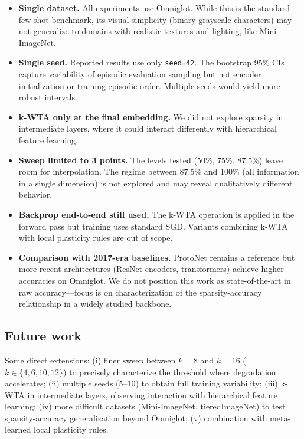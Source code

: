 \documentclass[11pt]{article}
\begin{document}
\begin{itemize}
\item \textbf{Single dataset.} All experiments use Omniglot. While this is the standard few-shot benchmark, its visual simplicity (binary grayscale characters) may not generalize to domains with realistic textures and lighting, like Mini-ImageNet.
\item \textbf{Single seed.} Reported results use only \texttt{seed=42}. The bootstrap 95\% CIs capture variability of episodic evaluation sampling but not encoder initialization or training episodic order. Multiple seeds would yield more robust intervals.
\item \textbf{k-WTA only at the final embedding.} We did not explore sparsity in intermediate layers, where it could interact differently with hierarchical feature learning.
\item \textbf{Sweep limited to 3 points.} The levels tested (50\%, 75\%, 87.5\%) leave room for interpolation. The regime between 87.5\% and 100\% (all information in a single dimension) is not explored and may reveal qualitatively different behavior.
\item \textbf{Backprop end-to-end still used.} The k-WTA operation is applied in the forward pass but training uses standard SGD. Variants combining k-WTA with local plasticity rules are out of scope.
\item \textbf{Comparison with 2017-era baselines.} ProtoNet remains a reference but more recent architectures (ResNet encoders, transformers) achieve higher accuracies on Omniglot. We do not position this work as state-of-the-art in raw accuracy---focus is on characterization of the sparsity-accuracy relationship in a widely studied backbone.
\end{itemize}

\subsection{Future work}

Some direct extensions: (i) finer sweep between $k=8$ and $k=16$ ($k \in \{4, 6, 10, 12\}$) to precisely characterize the threshold where degradation accelerates; (ii) multiple seeds (5--10) to obtain full training variability; (iii) k-WTA in intermediate layers, observing interaction with hierarchical feature learning; (iv) more difficult datasets (Mini-ImageNet, tieredImageNet) to test sparsity-accuracy generalization beyond Omniglot; (v) combination with meta-learned local plasticity rules.
\end{document}
